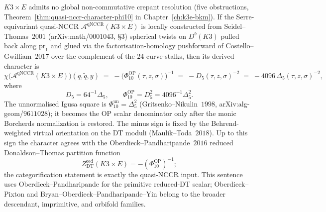 \begin{theorem}
\label{thm:k3-chiral-bialgebra-quasi-nccr}
$K3 \times E$ admits no global non-commutative crepant resolution (five obstructions, Theorem~\ref{thm:quasi-nccr-character-phi10} in Chapter~\ref{ch:k3e-bkm}). If the Serre-equivariant quasi-NCCR $\mathcal{A}^{\mathrm{qNCCR}}(K3 \times E)$ is locally constructed from Seidel--Thomas~$2001$ (arXiv:math/$0001043$, \S$3$) spherical twists on $D^b(K3)$ pulled back along $\mathrm{pr}_1$ and glued via the factorisation-homology pushforward of Costello--Gwilliam~$2017$ over the complement of the $24$ curve-stalks, then its derived character is
\[
 \chi\bigl(\mathcal{A}^{\mathrm{qNCCR}}(K3 \times E)\bigr)(q, \tilde q, y)
 \;=\;
 -\bigl(\Phi_{10}^{\mathrm{OP}}(\tau,z,\sigma)\bigr)^{-1}
 \;=\;
 -D_5(\tau,z,\sigma)^{-2}
 \;=\;
 -4096\,\Delta_5(\tau,z,\sigma)^{-2},
\]
where
\[
 D_5=64^{-1}\Delta_5,
 \qquad
 \Phi_{10}^{\mathrm{OP}}=D_5^2=4096^{-1}\Delta_5^2.
\]
The unnormalised Igusa square is \(\Phi_{10}^{\mathrm{un}}=\Delta_5^2\)
(Gritsenko--Nikulin~$1998$, arXiv:alg-geom/$9611028$); it becomes the OP
scalar denominator only after the monic Borcherds normalization is restored.
The minus sign is fixed by the Behrend-weighted virtual orientation on the
DT moduli (Maulik--Toda~$2018$). Up to this sign the character agrees with
the Oberdieck--Pandharipande~$2016$ reduced Donaldson--Thomas partition
function
\[
 Z^{\mathrm{red}}_{\mathrm{DT}}(K3 \times E)
 =
 -(\Phi_{10}^{\mathrm{OP}})^{-1};
\]
the categorification statement is exactly the quasi-NCCR input.
This sentence uses Oberdieck--Pandharipande for the primitive reduced-DT
scalar; Oberdieck--Pixton and Bryan--Oberdieck--Pandharipande--Yin belong
to the broader descendant, imprimitive, and orbifold families.
\end{theorem}

